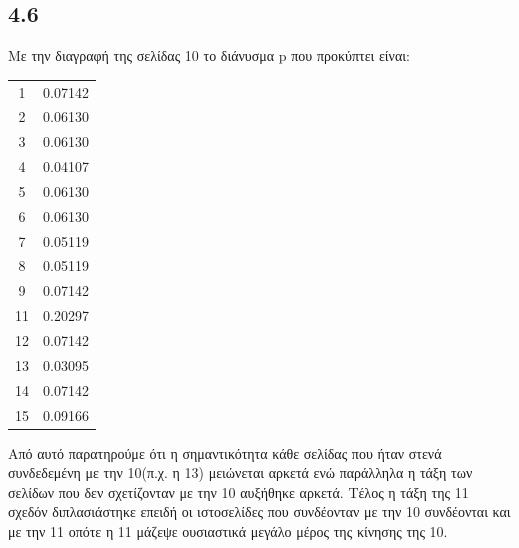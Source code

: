\documentclass[a4paper,11pt]{article}
\begin{document}
\begin{flushleft}
\subsection*{4.6}
Με την διαγραφή της σελίδας 10 το διάνυσμα p που προκύπτει είναι: 
\begin{center}
    \begin{tabular}{|c|c|}
        \hline
        1 & 0.07142 \\
        2 & 0.06130 \\
        3 & 0.06130 \\
        4 & 0.04107 \\
        5 & 0.06130 \\
        6 & 0.06130 \\
        7 & 0.05119 \\
        8 & 0.05119 \\
        9 & 0.07142 \\
        11 & 0.20297 \\
        12 & 0.07142 \\
        13 & 0.03095 \\
        14 & 0.07142 \\
        15 & 0.09166 \\
        \hline
    \end{tabular}
\end{center}
Από αυτό παρατηρούμε ότι η σημαντικότητα κάθε σελίδας που ήταν στενά συνδεδεμένη με την 10(π.χ. η 13) μειώνεται αρκετά ενώ παράλληλα η τάξη των σελίδων που δεν σχετίζονταν με την 10 αυξήθηκε αρκετά. Τέλος η τάξη της 11 σχεδόν διπλασιάστηκε επειδή οι ιστοσελίδες που συνδέονταν με την 10 συνδέονται και με την 11 οπότε η 11 μάζεψε ουσιαστικά μεγάλο μέρος της κίνησης της 10.
\end{flushleft}
\end{document}
